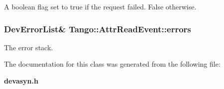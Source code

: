 A boolean flag set to true if the request failed. False otherwise. 

\subsubsection[{errors}]{\setlength{\rightskip}{0pt plus 5cm}Dev\-Error\-List\& Tango\-::\-Attr\-Read\-Event\-::errors}\label{classTango_1_1AttrReadEvent_ac15cd8804bb7185316d718a7fca674ff}


The error stack. 



The documentation for this class was generated from the following file\-:\begin{DoxyCompactItemize}
\item 
{\bf devasyn.\-h}\end{DoxyCompactItemize}
